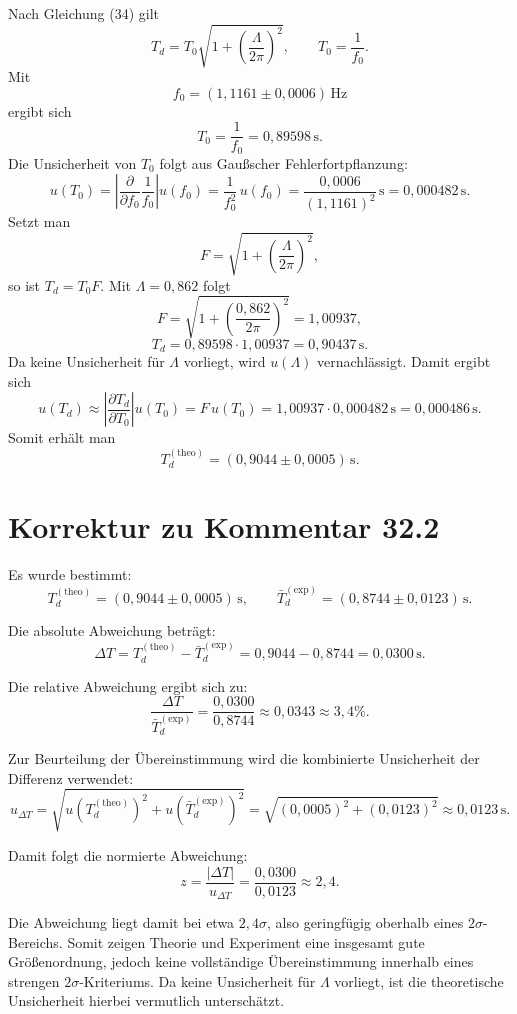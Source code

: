 \documentclass{report}
\begin{document}
Nach Gleichung (34) gilt
\[
T_d = T_0\sqrt{1+\left(\frac{\Lambda}{2\pi}\right)^2},
\qquad
T_0=\frac{1}{f_0}.
\]
\noindent
Mit
\[
f_0=(1{,}1161\pm 0{,}0006)\,\mathrm{Hz}
\]
\noindent
ergibt sich
\[
T_0=\frac{1}{f_0}=0{,}89598\,\mathrm{s}.
\]
\noindent
Die Unsicherheit von $T_0$ folgt aus Gaußscher Fehlerfortpflanzung:
\[
u(T_0)=\left|\frac{\partial}{\partial f_0}\frac{1}{f_0}\right|u(f_0)
=\frac{1}{f_0^2}\,u(f_0)
=\frac{0{,}0006}{(1{,}1161)^2}\,\mathrm{s}
=0{,}000482\,\mathrm{s}.
\]
\noindent
Setzt man
\[
F=\sqrt{1+\left(\frac{\Lambda}{2\pi}\right)^2},
\]
so ist $T_d=T_0F$. Mit $\Lambda=0{,}862$ folgt
\[
F=\sqrt{1+\left(\frac{0{,}862}{2\pi}\right)^2}=1{,}00937,
\]
\[
T_d = 0{,}89598\cdot 1{,}00937 = 0{,}90437\,\mathrm{s}.
\]
\noindent
Da keine Unsicherheit für $\Lambda$ vorliegt, wird $u(\Lambda)$ vernachlässigt. Damit ergibt sich
\[
u(T_d)\approx \left|\frac{\partial T_d}{\partial T_0}\right|u(T_0)=F\,u(T_0)
=1{,}00937\cdot 0{,}000482\,\mathrm{s}
=0{,}000486\,\mathrm{s}.
\]
\noindent
Somit erhält man
\[
\boxed{T_d^{(\mathrm{theo})}=(0{,}9044\pm 0{,}0005)\,\mathrm{s}.}
\]




\section{Korrektur zu Kommentar 32.2}

Es wurde bestimmt:
\[
T_d^{(\mathrm{theo})}=(0{,}9044\pm 0{,}0005)\,\mathrm{s},
\qquad
\bar T_d^{(\mathrm{exp})}=(0{,}8744\pm 0{,}0123)\,\mathrm{s}.
\]

Die absolute Abweichung beträgt:
\[
\Delta T = T_d^{(\mathrm{theo})}-\bar T_d^{(\mathrm{exp})}
=0{,}9044-0{,}8744
=0{,}0300\,\mathrm{s}.
\]

Die relative Abweichung ergibt sich zu:
\[
\frac{\Delta T}{\bar T_d^{(\mathrm{exp})}}
=\frac{0{,}0300}{0{,}8744}
\approx 0{,}0343 \approx 3{,}4\%.
\]

Zur Beurteilung der Übereinstimmung wird die kombinierte Unsicherheit der Differenz verwendet:
\[
u_{\Delta T}=\sqrt{u(T_d^{(\mathrm{theo})})^2+u(\bar T_d^{(\mathrm{exp})})^2}
=\sqrt{(0{,}0005)^2+(0{,}0123)^2}
\approx 0{,}0123\,\mathrm{s}.
\]

Damit folgt die normierte Abweichung:
\[
z=\frac{|\Delta T|}{u_{\Delta T}}
=\frac{0{,}0300}{0{,}0123}
\approx 2{,}4.
\]

Die Abweichung liegt damit bei etwa $2{,}4\sigma$, also geringfügig oberhalb eines $2\sigma$-Bereichs.
Somit zeigen Theorie und Experiment eine insgesamt gute Größenordnung, jedoch keine vollständige Übereinstimmung innerhalb eines strengen $2\sigma$-Kriteriums.
Da keine Unsicherheit für $\Lambda$ vorliegt, ist die theoretische Unsicherheit hierbei vermutlich unterschätzt.
\end{document}
